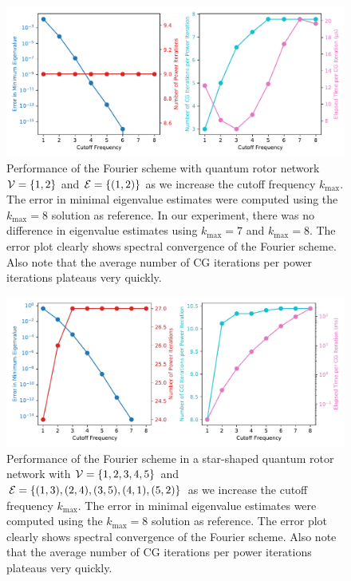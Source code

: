 \documentclass{amsart}
\begin{document}
\begin{figure}
  \includegraphics[width=\textwidth]{figures/2d_fourier_self_convergence_analysis.pdf}
  \caption{Performance of the Fourier scheme with quantum rotor network $\mathcal{V} =
  \{1, 2\}$ and $\mathcal{E} = \{(1, 2)\}$ as we increase the cutoff frequency
  $k_\text{max}$. The error in minimal eigenvalue estimates were computed using
  the $k_\text{max} = 8$ solution as reference. In our experiment, there was no
  difference in eigenvalue estimates using $k_\text{max} = 7$ and $k_\text{max}
  = 8$. The error plot clearly shows spectral convergence of the Fourier
  scheme. Also note that the average number of CG iterations per power
  iterations plateaus very quickly.}
  \label{fig:2d-fourier-self-convergence-analysis}
\end{figure}

\begin{figure}
  \includegraphics[width=\textwidth]{figures/5d_fourier_self_convergence_analysis.pdf}
  \caption{Performance of the Fourier scheme in a star-shaped quantum rotor
  network with $\mathcal{V} = \{1, 2, 3, 4, 5\}$ and $\mathcal{E} = \{(1, 3), (2, 4), (3, 5),
  (4, 1), (5, 2)\}$ as we increase the cutoff frequency $k_\text{max}$. The
  error in minimal eigenvalue estimates were computed using the $k_\text{max} =
  8$ solution as reference. The error plot clearly shows spectral convergence
  of the Fourier scheme. Also note that the average number of CG iterations per
  power iterations plateaus very quickly.}
  \label{fig:5d-fourier-self-convergence-analysis}
\end{figure}
\end{document}
